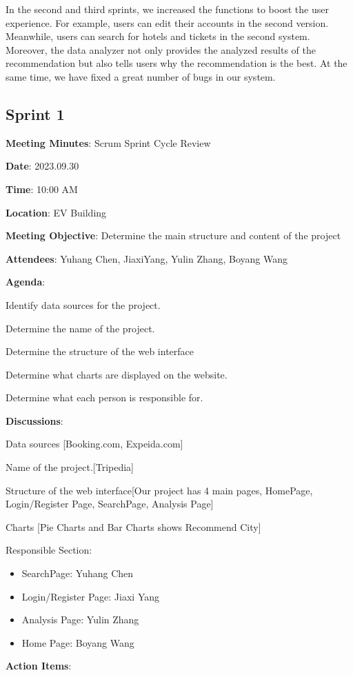 \documentclass[conference]{IEEEtran}
\begin{document}
In the second and third sprints, we increased the functions to boost the user experience. For example, users can edit their accounts in the second version. Meanwhile, users can search for hotels and tickets in the second system. Moreover, the data analyzer not only provides the analyzed results of the recommendation but also tells users why the recommendation is the best. At the same time, we have fixed a great number of bugs in our system.



\textbf{}

\subsection*{Sprint 1}

\textbf{Meeting Minutes}: Scrum Sprint Cycle Review

\textbf{Date}: 2023.09.30

\textbf{Time}: 10:00 AM

\textbf{Location}: EV Building

\textbf{Meeting Objective}: Determine the main structure and content of the project

\textbf{Attendees}:
Yuhang Chen, JiaxiYang, Yulin Zhang, Boyang Wang

\textbf{Agenda}:

Identify data sources for the project.

Determine the name of the project.

Determine the structure of the web interface

Determine what charts are displayed on the website.

Determine what each person is responsible for.

\textbf{Discussions}:

Data sources [Booking.com, Expeida.com]

Name of the project.[Tripedia]

Structure of the web interface[Our project has 4 main pages, HomePage, Login/Register Page, SearchPage, Analysis Page]

Charts [Pie Charts and Bar Charts shows Recommend City]

Responsible Section:
\begin{itemize}
\item SearchPage: Yuhang Chen
\item Login/Register Page: Jiaxi Yang
\item Analysis Page: Yulin Zhang
\item Home Page: Boyang Wang
\end{itemize}
\textbf{Action Items}:
\end{document}
